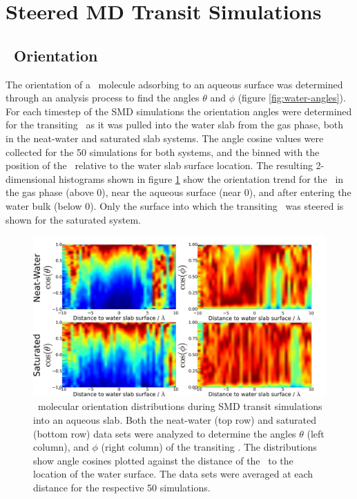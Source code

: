 \section{Steered MD Transit Simulations}

\subsection {\suldiox~Orientation}

	The orientation of a \suldiox~molecule adsorbing to an aqueous surface was determined through an analysis process to find the angles $\theta$ and $\phi$ (figure \ref{fig:water-angles}). For each timestep of the SMD simulations the orientation angles were determined for the transiting \suldiox~as it was pulled into the water slab from the gas phase, both in the neat-water and saturated slab systems. The angle cosine values were collected for the 50 simulations for both systems, and the binned with the position of the \suldiox~relative to the water slab surface location. The resulting 2-dimensional histograms shown in figure \ref{fig:so2-transit-angles} show the orientation trend for the \suldiox~in the gas phase (above 0\angs), near the aqueous surface (near 0\angs), and after entering the water bulk (below 0\angs). Only the surface into which the transiting \suldiox~was steered is shown for the saturated system.

\begin{figure}[h!]
	\begin{center}
		\includegraphics[scale=1.0]{images/transit-so2-angles/so2-angles-transit.png}
		\caption{\suldiox~molecular orientation distributions during SMD transit simulations into an aqueous slab. Both the neat-water (top row) and saturated (bottom row) data sets were analyzed to determine the angles $\theta$ (left column), and $\phi$ (right column) of the transiting \suldiox. The distributions show angle cosines plotted against the distance of the \suldiox~to the location of the water surface. The data sets were averaged at each distance for the respective 50 simulations.}
		\label{fig:so2-transit-angles}
	\end{center}
\end{figure}

